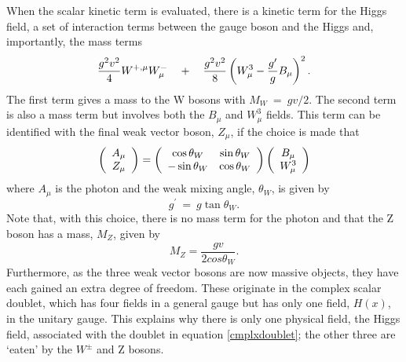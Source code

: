 When the scalar kinetic term is evaluated, there is a kinetic term for the Higgs field, a set of interaction terms between the gauge boson and the Higgs and, importantly, the mass terms
\begin{equation}\label{massterms}
\vspace{0.2cm}
\frac{g^2v^2}{4}W^{+,\mu}W^{-}_{\mu} \quad + \quad
\frac{g^2v^2}{8}\left(W^{3}_{\mu} - \frac{g^{\prime}}{g}B_{\mu}\right)^2.
\end{equation}
The first term %
gives a mass to the W bosons with $M_W~=~gv/2$. The second term is also a mass term but involves both the $B_{\mu}$ and $W^3_{\mu}$ fields. This term can be identified with the final weak vector boson, $Z_{\mu}$, if the choice is made that 
\begin{equation}
\vspace{0.2cm}
\left(\begin{array}{c}
A _{\mu} \\ Z_{\mu}
\end{array}\right)
=
\left(\begin{array}{cc}
\cos\theta_W & \sin\theta_W \\
-\sin\theta_W & \cos\theta_W 
\end{array}\right)
\left(
\begin{array}{c}
B_{\mu} \\ W^3_{\mu}
\end{array}
\right)
\end{equation}
where $A_{\mu}$ is the photon and the weak mixing angle, $\theta_W$, is given by 
\begin{equation}
g^{\prime}~=~g\tan\theta_W.
\end{equation}
Note that, with this choice, there is no mass term for the photon and that the Z boson has a mass, $M_Z$, given by 
\begin{equation}
M_Z = \frac{gv}{2cos\theta_W}.
\end{equation} 
Furthermore, as the three weak vector bosons are now massive objects, they have each gained an extra degree of freedom. These originate in the complex scalar doublet, which has four fields in a general gauge but has only one field, $H(x)$, in the unitary gauge. This explains why there is only one physical field, the Higgs field, associated with the doublet in equation \ref{cmplxdoublet}; the other three are `eaten' by the $W^{\pm}$ and Z bosons.  %


